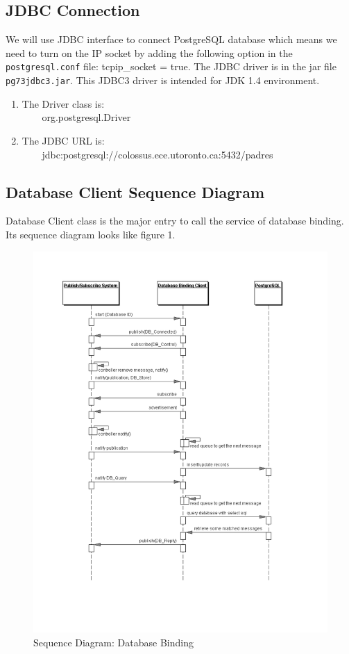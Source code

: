 \documentclass[11pt]{article}
\begin{document}
\subsection{JDBC Connection}      %
We will use JDBC interface to connect PostgreSQL database which means we need to turn on the IP socket by adding the following option in the \verb+postgresql.conf+ file: tcpip\_socket = true. The JDBC driver is in the jar file \verb+pg73jdbc3.jar+. This JDBC3 driver is intended for JDK 1.4 environment.  
\begin{enumerate}
\item The Driver class is:\\
\verb+    +org.postgresql.Driver
\item The JDBC URL is:\\
\verb+    +jdbc:postgresql://colossus.ece.utoronto.ca:5432/padres
\end{enumerate}

\subsection{Database Client Sequence Diagram}    %
Database Client class is the major entry to call the service of database binding. Its sequence diagram looks like figure 1.
\begin{figure}[htbp]
\begin{center}
\caption{Sequence Diagram: Database Binding}
\includegraphics{dbbinding_seq}
\end{center}
\end{figure}
\end{document}
